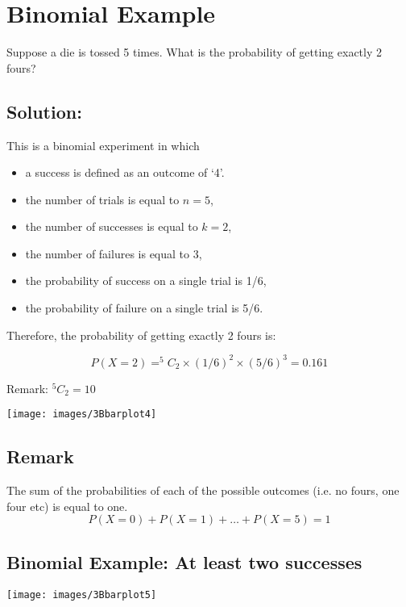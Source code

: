 \documentclass[a4paper,12pt]{article}
\begin{document}
\section*{Binomial Example }

Suppose a die is tossed 5 times. What is the probability of getting exactly 2 fours?

\subsection*{Solution:}

This is a binomial experiment in which \begin{itemize}\item a success is defined as an outcome of `4'. \item the number of trials is equal to $n=5$, \item the number of successes is equal to $k=2$,\item the number of failures is equal to 3, \item  the probability of success on a single trial is 1/6, \item  the probability of failure on a single trial is 5/6.\end{itemize}

\smallskip

Therefore, the probability of getting exactly 2 fours is:

\[P(X=2) = ^5C_2 \times (1/6)^2 \times (5/6)^3 = 0.161\]

Remark: $^5C_2 = 10$\\
\bigskip

\begin{center}
\texttt{[image: images/3Bbarplot4]}
\end{center}


\subsection*{Remark}  The sum of the probabilities of each of the possible outcomes (i.e. no fours, one four etc) is equal to one.
\[P(X=0) + P(X = 1) + \ldots + P(X=5) = 1 \]


\subsection*{Binomial Example: At least two successes}

\begin{center}
\texttt{[image: images/3Bbarplot5]}
\end{center}
\end{document}
